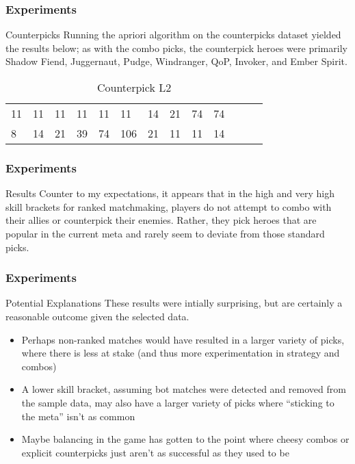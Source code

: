 \documentclass{beamer}
\begin{document}
\begin{frame}
\frametitle{Experiments}

\begin{block}{Counterpicks}
Running the apriori algorithm on the counterpicks dataset yielded the results below; as with the combo picks, the counterpick heroes were primarily Shadow Fiend, Juggernaut, Pudge, Windranger, QoP, Invoker, and Ember Spirit.
\end{block}

\begin{table}
\begin{tabular}{l l l l l l l l l l l l l}
\toprule
11 & 11 & 11 & 11 & 11 & 11 & 14 & 21 & 74 & 74\\
8 & 14 & 21 & 39 & 74 & 106 & 21 & 11 & 11 & 14 \\
\bottomrule
\end{tabular}
\caption{Counterpick L2}
\end{table}
\end{frame}

\begin{frame}
\frametitle{Experiments}
\begin{block}{Results}
Counter to my expectations, it appears that in the high and very high skill brackets for ranked matchmaking, players do not attempt to combo with their allies or counterpick their enemies. Rather, they pick heroes that are popular in the current meta and rarely seem to deviate from those standard picks.
\end{block}
\end{frame}

\begin{frame}
\frametitle{Experiments}
\begin{block}{Potential Explanations}
These results were intially surprising, but are certainly a reasonable outcome given the selected data. 
\begin{itemize}
	\item Perhaps non-ranked matches would have resulted in a larger variety of picks, where there is less at stake (and thus more experimentation in strategy and combos)
	\item A lower skill bracket, assuming bot matches were detected and removed from the sample data, may also have a larger variety of picks where ``sticking to the meta'' isn't as common
	\item Maybe balancing in the game has gotten to the point where cheesy combos or explicit counterpicks just aren't as successful as they used to be
\end{itemize}
\end{block}
\end{frame}
\end{document}
